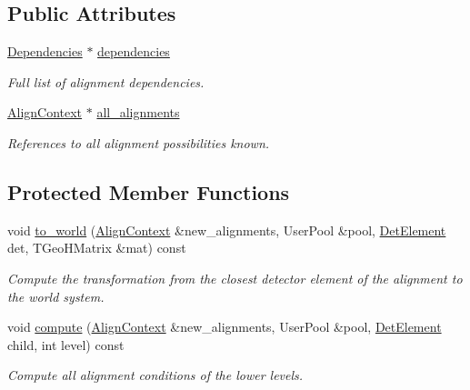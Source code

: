 \subsection*{Public Attributes}
\begin{DoxyCompactItemize}
\item 
\hyperlink{class_d_d4hep_1_1_conditions_1_1_conditions_dependency_collection}{Dependencies} $\ast$ \hyperlink{class_d_d4hep_1_1_alignments_1_1_alignments_manager_object_ad936882d8b5fcccecb4a13821539413e}{dependencies}
\begin{DoxyCompactList}\small\item\em Full list of alignment dependencies. \item\end{DoxyCompactList}\item 
\hyperlink{class_d_d4hep_1_1_alignments_1_1_align_context}{AlignContext} $\ast$ \hyperlink{class_d_d4hep_1_1_alignments_1_1_alignments_manager_object_ace0f6d572f7c1432436db1aab7a82dca}{all\_\-alignments}
\begin{DoxyCompactList}\small\item\em References to all alignment possibilities known. \item\end{DoxyCompactList}\end{DoxyCompactItemize}
\subsection*{Protected Member Functions}
\begin{DoxyCompactItemize}
\item 
void \hyperlink{class_d_d4hep_1_1_alignments_1_1_alignments_manager_object_a69d0f7c21afe5cdd6d34a8c8e460f285}{to\_\-world} (\hyperlink{class_d_d4hep_1_1_alignments_1_1_align_context}{AlignContext} \&new\_\-alignments, UserPool \&pool, \hyperlink{namespace_d_d4hep_a21dd977310ff183f61ca6ae14b59a989}{DetElement} det, TGeoHMatrix \&mat) const 
\begin{DoxyCompactList}\small\item\em Compute the transformation from the closest detector element of the alignment to the world system. \item\end{DoxyCompactList}\item 
void \hyperlink{class_d_d4hep_1_1_alignments_1_1_alignments_manager_object_aa1b340adcf40221ef1e07ca6e297660f}{compute} (\hyperlink{class_d_d4hep_1_1_alignments_1_1_align_context}{AlignContext} \&new\_\-alignments, UserPool \&pool, \hyperlink{namespace_d_d4hep_a21dd977310ff183f61ca6ae14b59a989}{DetElement} child, int level) const 
\begin{DoxyCompactList}\small\item\em Compute all alignment conditions of the lower levels. \item\end{DoxyCompactList}\end{DoxyCompactItemize}


